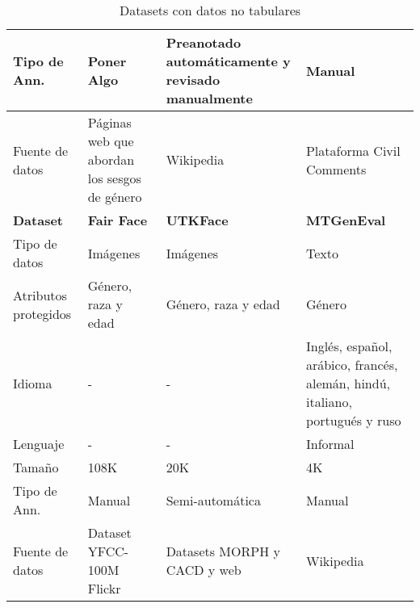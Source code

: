 \begin{table}[htpb]
{\begin{tabular}{lp{}p{}p{}}
                \midrule
                Tipo de Ann.         & Poner Algo                                       & Preanotado autom\'aticamente y revisado manualmente & Manual                          \\
                \midrule
                Fuente de datos      & P\'aginas web que abordan los sesgos de g\'enero & Wikipedia                                           & Plataforma Civil Comments       \\
                \toprule
                \toprule
                \textbf{Dataset}     & \textbf{Fair Face}                               & \textbf{UTKFace}                                    & \textbf{MTGenEval}              \\
                \toprule
                \toprule
                Tipo de datos        & Im\'agenes                                       & Im\'agenes                                          & Texto                           \\
                \midrule
                Atributos protegidos & G\'enero, raza y edad                            & G\'enero, raza y edad                               & G\'enero                        \\
                \midrule
                Idioma               & -                                                & -                                                   & Ingl\'es, espa\~nol, ar\'abico, franc\'es, alem\'an, hind\'u, italiano, portugu\'es y ruso\\
                \midrule
                Lenguaje             & -                                                & -                                                   & Informal                        \\
                \midrule
                Tama\~no             & 108K                                             & 20K                                                 & 4K                              \\
                \midrule
                Tipo de Ann.         & Manual                                           & Semi-autom\'atica                                   & Manual                          \\
                \midrule
                Fuente de datos      &  Dataset YFCC-100M Flickr                        & Datasets MORPH y CACD y web                         & Wikipedia                       \\
                \bottomrule
                \bottomrule
            \end{tabular}}
        \caption{Datasets con datos no tabulares}
        \label{table:datasets}
    \end{table}
    
